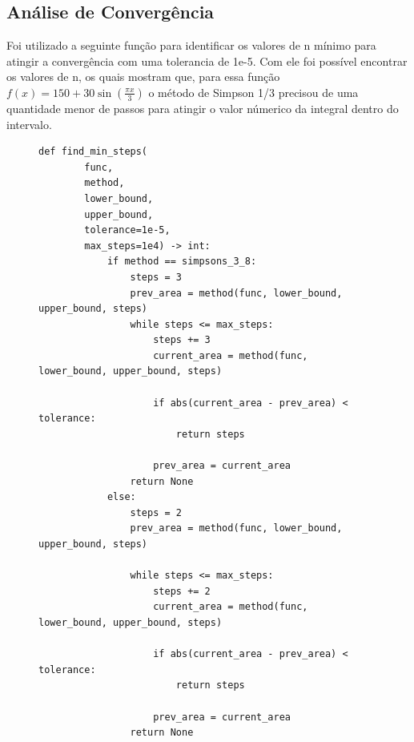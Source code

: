 \documentclass{article}
\begin{document}
\subsection*{Análise de Convergência}
Foi utilizado a seguinte função para identificar os valores de n mínimo para atingir a convergência com uma tolerancia de 1e-5. Com ele foi possível encontrar os valores de n, os quais mostram que, para essa função $f(x) = 150 + 30\sin(\frac{\pi x}{3})$ o método de Simpson 1/3 precisou de uma quantidade menor de passos para atingir o valor númerico da integral dentro do intervalo.
\begin{figure}[H]
    \begin{lstlisting}[caption={Função para encontrar o número mínimo de passos para convergência.}, label={lst:find_steps}]
        def find_min_steps(
        func, 
        method, 
        lower_bound, 
        upper_bound, 
        tolerance=1e-5, 
        max_steps=1e4) -> int:
            if method == simpsons_3_8:
                steps = 3
                prev_area = method(func, lower_bound, upper_bound, steps)
                while steps <= max_steps:
                    steps += 3
                    current_area = method(func, lower_bound, upper_bound, steps)
                    
                    if abs(current_area - prev_area) < tolerance:
                        return steps
                    
                    prev_area = current_area
                return None
            else:
                steps = 2
                prev_area = method(func, lower_bound, upper_bound, steps)
                
                while steps <= max_steps:
                    steps += 2
                    current_area = method(func, lower_bound, upper_bound, steps)
                    
                    if abs(current_area - prev_area) < tolerance:
                        return steps
                    
                    prev_area = current_area
                return None
    \end{lstlisting}
\end{figure}
\end{document}
